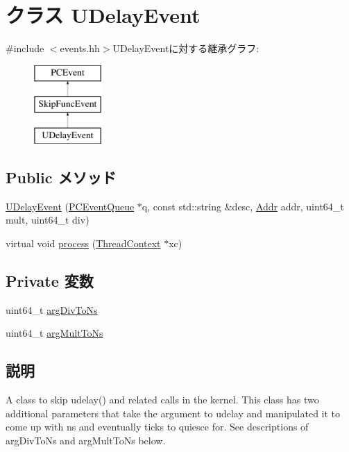 \hypertarget{classLinux_1_1UDelayEvent}{
\section{クラス UDelayEvent}
\label{classLinux_1_1UDelayEvent}
}


{\ttfamily \#include $<$events.hh$>$}UDelayEventに対する継承グラフ:\begin{figure}[H]
\begin{center}
\leavevmode
\includegraphics[height=3cm]{classLinux_1_1UDelayEvent}
\end{center}
\end{figure}
\subsection*{Public メソッド}
\begin{DoxyCompactItemize}
\item 
\hyperlink{classLinux_1_1UDelayEvent_a0b3c05abde3a4fc6b3ee00842bc8cd19}{UDelayEvent} (\hyperlink{classPCEventQueue}{PCEventQueue} $\ast$q, const std::string \&desc, \hyperlink{base_2types_8hh_af1bb03d6a4ee096394a6749f0a169232}{Addr} addr, uint64\_\-t mult, uint64\_\-t div)
\item 
virtual void \hyperlink{classLinux_1_1UDelayEvent_a7f346b2e15a406283e587b1123735488}{process} (\hyperlink{classThreadContext}{ThreadContext} $\ast$xc)
\end{DoxyCompactItemize}
\subsection*{Private 変数}
\begin{DoxyCompactItemize}
\item 
uint64\_\-t \hyperlink{classLinux_1_1UDelayEvent_a53a99750094ff662ba0e0ce44b16879d}{argDivToNs}
\item 
uint64\_\-t \hyperlink{classLinux_1_1UDelayEvent_a5a6e4a5afa3827ac67897e3e2ca27291}{argMultToNs}
\end{DoxyCompactItemize}


\subsection{説明}
A class to skip udelay() and related calls in the kernel. This class has two additional parameters that take the argument to udelay and manipulated it to come up with ns and eventually ticks to quiesce for. See descriptions of argDivToNs and argMultToNs below. 

